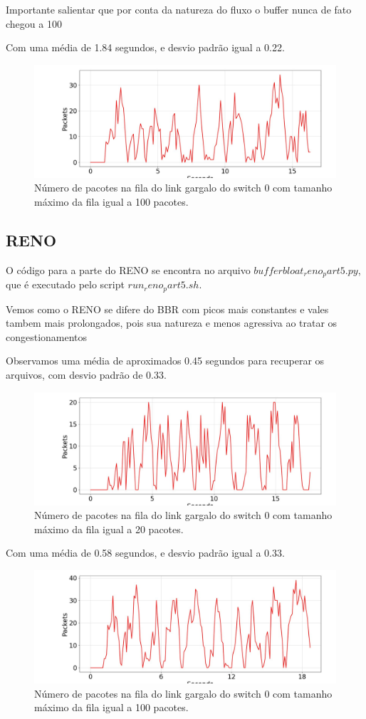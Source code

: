 \documentclass[a4paper,12pt]{article}
\begin{document}
Importante salientar que por conta da natureza do fluxo o buffer nunca de fato chegou a 100


Com uma média de 1.84 segundos, e desvio padrão igual a 0.22.

\begin{figure}[ht!]
	
	\centering
	\includegraphics[width=0.5\columnwidth]{./bufferbloat/bb-q100/bbr-part5-buffer-q100.jpg}
	\caption{Número de pacotes na fila do link gargalo do switch 0 com tamanho máximo da fila igual a 100 pacotes.}
\end{figure}

\subsection{RENO}

O código para a parte do RENO se encontra no arquivo $bufferbloat_reno_part5.py$, que é executado pelo script $run_reno_part5.sh$.

Vemos como o RENO se difere do BBR com picos mais constantes e vales tambem mais prolongados, pois sua natureza e menos agressiva ao tratar os congestionamentos 

Observamos uma média de aproximados 0.45 segundos para recuperar os arquivos, com desvio padrão de 0.33.

\begin{figure}[ht!]
	\centering
	\includegraphics[width=0.5\columnwidth]{./bufferbloat/bb-q20/reno-part5-buffer-q20.jpg}
	\caption{Número de pacotes na fila do link gargalo do switch 0 com tamanho máximo da fila igual a 20 pacotes.}
\end{figure}


Com uma média de 0.58 segundos, e desvio padrão igual a 0.33.

\begin{figure}[ht!]
	\centering
	\includegraphics[width=0.5\columnwidth]{./bufferbloat/bb-q100/reno-part5-buffer-q100.jpg}
	\caption{Número de pacotes na fila do link gargalo do switch 0 com tamanho máximo da fila igual a 100 pacotes.}
\end{figure}
\end{document}

